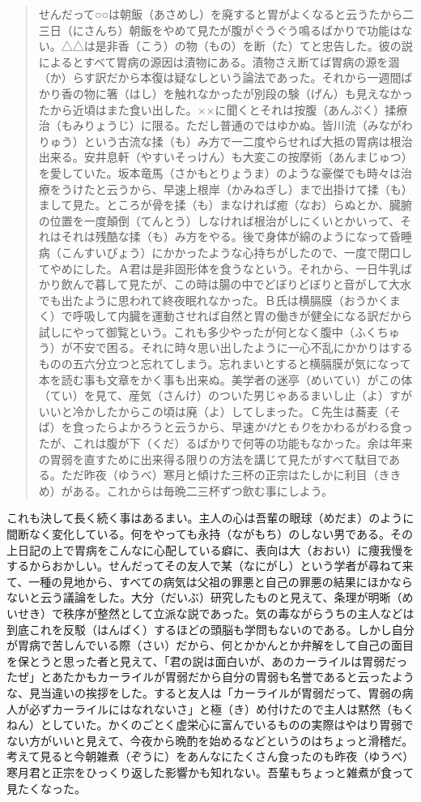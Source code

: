 \documentclass{book}
\begin{document}
\blockquote{せんだって○○は朝飯（あさめし）を廃すると胃がよくなると云うたから二三日（にさんち）朝飯をやめて見たが腹がぐうぐう鳴るばかりで功能はない。△△は是非香（こう）の物（もの）を断（た）てと忠告した。彼の説によるとすべて胃病の源因は漬物にある。漬物さえ断てば胃病の源を涸（か）らす訳だから本復は疑なしという論法であった。それから一週間ばかり香の物に箸（はし）を触れなかったが別段の験（げん）も見えなかったから近頃はまた食い出した。××に聞くとそれは按腹（あんぷく）揉療治（もみりょうじ）に限る。ただし普通のではゆかぬ。皆川流（みながわりゅう）という古流な揉（も）み方で一二度やらせれば大抵の胃病は根治出来る。安井息軒（やすいそっけん）も大変この按摩術（あんまじゅつ）を愛していた。坂本竜馬（さかもとりょうま）のような豪傑でも時々は治療をうけたと云うから、早速上根岸（かみねぎし）まで出掛けて揉（も）まして見た。ところが骨を揉（も）まなければ癒（なお）らぬとか、臓腑の位置を一度顛倒（てんとう）しなければ根治がしにくいとかいって、それはそれは残酷な揉（も）み方をやる。後で身体が綿のようになって昏睡病（こんすいびょう）にかかったような心持ちがしたので、一度で閉口してやめにした。Ａ君は是非固形体を食うなという。それから、一日牛乳ばかり飲んで暮して見たが、この時は腸の中でどぼりどぼりと音がして大水でも出たように思われて終夜眠れなかった。Ｂ氏は横膈膜（おうかくまく）で呼吸して内臓を運動させれば自然と胃の働きが健全になる訳だから試しにやって御覧という。これも多少やったが何となく腹中（ふくちゅう）が不安で困る。それに時々思い出したように一心不乱にかかりはするものの五六分立つと忘れてしまう。忘れまいとすると横膈膜が気になって本を読む事も文章をかく事も出来ぬ。美学者の迷亭（めいてい）がこの体（てい）を見て、産気（さんけ）のついた男じゃあるまいし止（よ）すがいいと冷かしたからこの頃は廃（よ）してしまった。Ｃ先生は蕎麦（そば）を食ったらよかろうと云うから、早速\emph{かけ}と\emph{もり}をかわるがわる食ったが、これは腹が下（くだ）るばかりで何等の功能もなかった。余は年来の胃弱を直すために出来得る限りの方法を講じて見たがすべて駄目である。ただ昨夜（ゆうべ）寒月と傾けた三杯の正宗はたしかに利目（ききめ）がある。これからは毎晩二三杯ずつ飲む事にしよう。}

これも決して長く続く事はあるまい。主人の心は吾輩の眼球（めだま）のように間断なく変化している。何をやっても永持（ながもち）のしない男である。その上日記の上で胃病をこんなに心配している癖に、表向は大（おおい）に痩我慢をするからおかしい。せんだってその友人で某（なにがし）という学者が尋ねて来て、一種の見地から、すべての病気は父祖の罪悪と自己の罪悪の結果にほかならないと云う議論をした。大分（だいぶ）研究したものと見えて、条理が明晰（めいせき）で秩序が整然として立派な説であった。気の毒ながらうちの主人などは到底これを反駁（はんばく）するほどの頭脳も学問もないのである。しかし自分が胃病で苦しんでいる際（さい）だから、何とかかんとか弁解をして自己の面目を保とうと思った者と見えて、「君の説は面白いが、あのカーライルは胃弱だったぜ」とあたかもカーライルが胃弱だから自分の胃弱も名誉であると云ったような、見当違いの挨拶をした。すると友人は「カーライルが胃弱だって、胃弱の病人が必ずカーライルにはなれないさ」と極（き）め付けたので主人は黙然（もくねん）としていた。かくのごとく虚栄心に富んでいるものの実際はやはり胃弱でない方がいいと見えて、今夜から晩酌を始めるなどというのはちょっと滑稽だ。考えて見ると今朝雑煮（ぞうに）をあんなにたくさん食ったのも昨夜（ゆうべ）寒月君と正宗をひっくり返した影響かも知れない。吾輩もちょっと雑煮が食って見たくなった。
\end{document}
